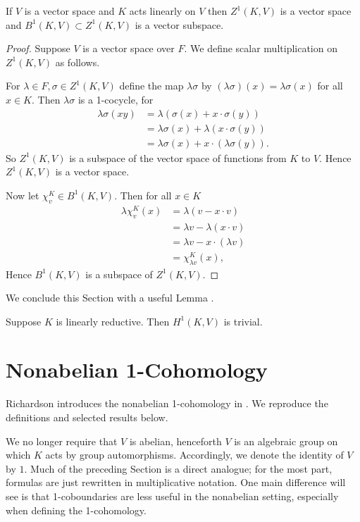 \begin{lemma} \label{vspace} If $V$ is a vector space and $K$ acts linearly on $V$ then $Z^1(K, V)$ is a vector space and $B^1(K, V)\subset Z^1(K, V)$ is a vector subspace.
\end{lemma}
\begin{proof}
	Suppose $V$ is a vector space over $F$. We define scalar multiplication on $Z^1(K, V)$ as follows.

For $\lambda \in F, \sigma \in Z^1(K, V)$ define the map $\lambda\sigma$ by $(\lambda\sigma)(x) = \lambda\sigma(x)$ for all $x \in K$. Then $\lambda\sigma$ is a 1-cocycle, for
\begin{align*}
	\lambda \sigma(xy) &= \lambda\left( \sigma(x) + x \cdot \sigma(y)\right) \\
	&= \lambda\sigma(x) + \lambda(x\cdot \sigma(y)) \\
	&= \lambda\sigma(x) + x \cdot (\lambda\sigma(y)).
\end{align*}
So $Z^1(K, V)$ is a subspace of the vector space of functions from $K$ to $V$. Hence $Z^1(K, V)$ is a vector space.

Now let $\chi^K_v \in B^1(K, V)$. Then for all $x \in K$
\begin{align*}
	\lambda\chi^K_v(x) &= \lambda\left(v - x \cdot v\right) \\
		&= \lambda v - \lambda(x \cdot v) \\
		&= \lambda v - x \cdot (\lambda v) \\
		&= \chi^K_{\lambda v}(x),
\end{align*}
Hence $B^1(K, V)$ is a subspace of $Z^1(K, V)$.
\end{proof}

We conclude this Section with a useful Lemma \cite[Proposition 1]{kemper2000characterization}.
\begin{lemma} Suppose $K$ is linearly reductive. Then $H^1(K, V)$ is trivial.
  \label{lem:lin_red_h}
\end{lemma}

\section{Nonabelian 1-Cohomology}
	
Richardson introduces the nonabelian 1-cohomology in \cite{richardson1982orbits}. We reproduce the definitions and selected results below.

We no longer require that $V$ is abelian, henceforth $V$ is an algebraic group on which $K$ acts by group automorphisms. Accordingly, we denote the identity of $V$ by $1$. Much of the preceding Section is a direct analogue; for the most part, formulas are just rewritten in multiplicative notation.
One main difference will see is that 1-coboundaries are less useful in the nonabelian setting, especially when defining the 1-cohomology.

